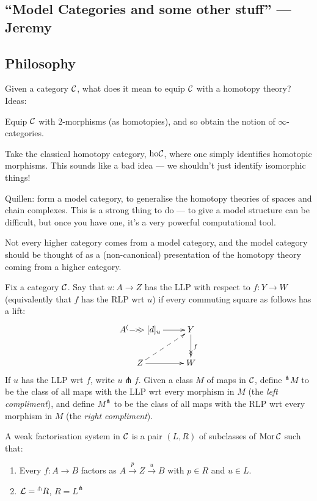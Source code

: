 \documentclass[11pt]{article}
\newcommand{\KanSemResponse}[1]
{
\thispagestyle{fancy}
\section{#1}
}
\begin{document}
\begin{JeremyModelCategories}
\KanSemResponse
{``Model Categories and some other stuff'' --- Jeremy}
\subsection*{Philosophy}
Given a category $\mathcal{C}$, what does it mean to equip $\mathcal{C}$ with a homotopy theory? Ideas:

\begin{itemise}
\item Equip $\mathcal{C}$ with 2-morphisms (as homotopies), and so obtain the notion of $\infty$-categories.
\item Take the classical homotopy category, $\textup{ho}\mathcal{C}$, where one simply identifies homotopic morphisms. This sounds like a bad idea --- we shouldn't just identify isomorphic things!
\item Quillen: form a model category, to generalise the homotopy theories of spaces and chain complexes. This is a strong thing to do --- to give a model structure can be difficult, but once you have one, it's a very powerful computational tool.
\end{itemise}
Not every higher category comes from a model category, and the model category should be thought of as a (non-canonical) presentation of the homotopy theory coming from a higher category.
\begin{defn*}
Fix a category $\mathcal{C}$. Say that $u:A\to Z$ has the LLP with respect to $f:Y\to W$ (equivalently that $f$ has the RLP wrt $u$) if every commuting square as follows has a lift:
\[\xymatrix{
A\ar[r]\xycofib[d]_u&Y\ar@{->>}[d]^f\\
Z\ar@{-->}[ru]\ar[r]&W
}\]
If $u$ has the LLP wrt $f$, write $u\pitchfork f$. Given a class $M$ of maps in $\mathcal{C}$, define $^\pitchfork M$ to be the class of all maps with the LLP wrt every morphism in $M$ (the \emph{left compliment}), and define $ M^\pitchfork$ to be the class of all maps with the RLP wrt every morphism in $M$ (the \emph{right compliment}).
\end{defn*}
\begin{defn*}
A weak factorisation system in $\mathcal{C}$ is a pair $(L,R)$ of subclasses of $\operatorname{Mor}\mathcal{C}$ such that:
\begin{enumerate}\squishlist
\item Every $f:A\to B$ factors as $A\overset{p}{\to} Z\overset{u}{\to} B$ with $p\in R$ and $u\in L$.
\item $\mathcal{L}={^\pitchfork R}$, $R=L^\pitchfork$
\end{enumerate}

\end{defn*}
\end{JeremyModelCategories}
\end{document}
